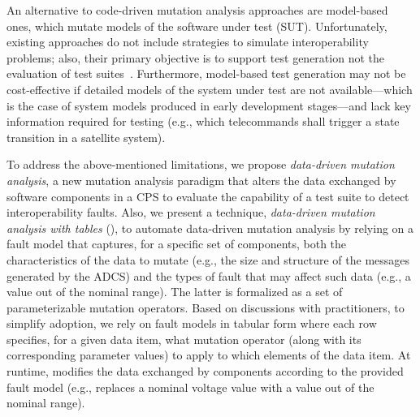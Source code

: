 An alternative to code-driven mutation analysis approaches are model-based ones, which mutate models of the software under test (SUT). 
Unfortunately, existing approaches do not include strategies to simulate interoperability problems; also, their primary objective is to support test generation not the evaluation of test suites~\cite{He2011,Aichernig2015,Devroey2016,BELLI201625}. 
Furthermore, model-based test generation may not be cost-effective if detailed models of the system under test are not available---which is the case of system models produced in early development stages---and lack key information required for testing (e.g., which telecommands shall trigger a state transition in a satellite system). 
%

To address the above-mentioned limitations, we propose \emph{data-driven mutation analysis}, 
a new mutation analysis paradigm
that alters the data exchanged by software components in a CPS to evaluate the capability of a test suite to detect interoperability faults. Also, we present a technique, \emph{data-driven mutation analysis with tables} (\APPR),
to automate data-driven mutation analysis by relying on
a fault model that captures, for a specific set of components, both the characteristics of the data to mutate (e.g., the size and structure of the messages generated by the ADCS) and the types of fault that may affect such data (e.g., a  value out of the nominal range). The latter is formalized as a set of parameterizable mutation operators. 
Based on discussions with practitioners, to simplify adoption, we rely on fault models in tabular form where each row specifies, for a given data item, what mutation operator (along with its corresponding parameter values) to apply to which elements of the data item.
At runtime, \APPR modifies the data exchanged by components according to the provided fault model (e.g., replaces a nominal voltage value with a value out of the nominal range).

